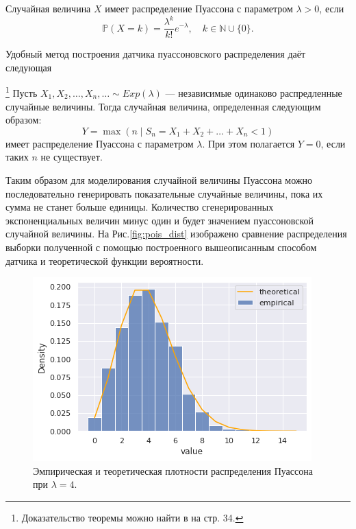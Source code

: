 \begin{definition}
	Случайная величина $X$ имеет распределение Пуассона с параметром $\lambda>0$,
	 если
	$$
	\mathbb{P}(X = k) = \frac{\lambda^k}{k!} e^{-\lambda}, \quad k \in \mathbb{N} 
	\cup \{0\}.
	$$
\end{definition}
Удобный метод построения датчика пуассоновского распределения даёт следующая 
\begin{theorem}\footnote{Доказательство теоремы можно найти в \cite{model_randoms}
	 на стр. 34.}
	Пусть $X_1,X_2,\ldots,X_n,\ldots\sim Exp(\lambda)$ --- независимые одинаково
	 распредленные случайные величины. Тогда случайная величина, определенная
	 следующим образом:
	$$
	Y = \max(n \mid S_n = X_1 + X_2 + \dots + X_n < 1)
	$$
	имеет распределение Пуассона с параметром $\lambda$. При этом полагается $Y=0$,
	 если таких $ n $ не существует.
\end{theorem}
 Таким образом для моделирования случайной величины Пуассона можно последовательно
 генерировать показательные случайные величины, пока их сумма не станет больше
 единицы. Количество сгенерированных экспоненциальных величин минус один и будет
 значением пуассоновской случайной величины. На Рис.\eqref{fig:pois_dist} изображено
 сравнение распределения выборки полученной с помощью построенного вышеописанным
 способом датчика и теоретической функции вероятности.

\begin{figure}[ht]
	\centering
	\includegraphics[width = 0.8\linewidth]{"./resources/pois_dist.png"}
	\caption{Эмпирическая и теоретическая плотности распределения Пуассона при
	 $ \lambda = 4 $.}
    \label{fig:pois_dist}
\end{figure}

